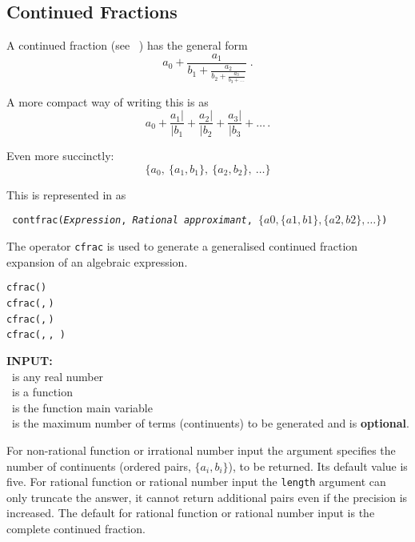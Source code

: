 %
%
%
\subsection{Continued Fractions}
\label{sec:rataprx:cf}
A continued fraction (see ~\cite{JonesThron:80}) has the general form
{\Large
\[a_0 + \frac{a_1}{b_1 +
         \frac{a_2}{b_2+
          \frac{a_3}{b_3 + \ldots
        }}}
\;.\]
}

A more compact way of writing this is as
\[a_0 + \frac{a_1|}{|b_1} + \frac{a_2|}{|b_2} + \frac{a_3|}{|b_3} + \ldots\,.\]

Even more succinctly:
\[\{a_0,\ \{a_1, b_1\},\ \{a_2, b_2\},\ \ldots\}\]

%
This is represented in {\REDUCE} as
\begin{center}\tt
  contfrac(\textsl{Expression},
    \textsl{Rational approximant},
                $\{a0, \{a1,b1\}, \{a2,b2\}, \dots\}$)
\end{center}

\hypertarget{operator:CFRAC}{}
The operator \texttt{cfrac}
is used to generate a generalised continued
fraction expansion of an algebraic expression.

\begin{syntaxtable}
  \texttt{cfrac(}\texttt{)}\\
  \texttt{cfrac(}\texttt{,}\,\texttt{)}\\
  \texttt{cfrac(}\texttt{,}\,\texttt{)}\\
  \texttt{cfrac(}\texttt{,}\,\texttt{,}\,%
  \texttt{)}
\end{syntaxtable}


\textbf{INPUT:}\\
 \ is any real number\\
 \ is a function\\
 \ is the function main variable\\
 \ is the maximum number of terms (continuents) to be
generated and is \textbf{optional}.

For non-rational function or irrational number input the 
argument specifies the number of continuents (ordered pairs, $\{a_i,b_i\}$),
to be returned. Its default value is five.
For rational function or rational number input the
\texttt{length} argument can only truncate the answer, it cannot
return additional pairs even if the precision is increased.
The default for rational function or rational number input is the
complete continued fraction.

